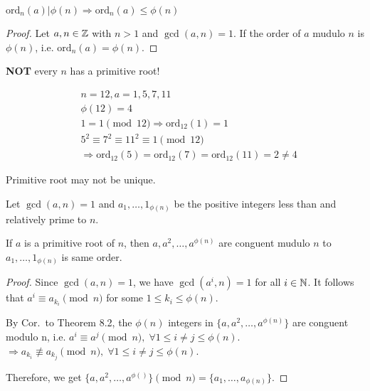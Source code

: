 
\begin{theorem}
    $\text{ord}_{n}(a) | \phi(n) \Rightarrow \text{ord}_{n}(a) \leq \phi(n)$ 
\end{theorem}
\begin{proof}
    Let $a, n \in \mathbb{Z}$ with $n > 1$ and $\gcd(a, n) = 1$. If the order of $a$ mudulo $n$ is $\phi(n)$, i.e.
    $\text{ord}_{n}(a) = \phi(n)$.
\end{proof}


\begin{remark}
    \textbf{NOT} every $n$ has a primitive root!
\end{remark}
\begin{eg}
    \[
        \begin{aligned}        
            & n=12, a=1, 5, 7, 11 \\
            & \phi(12) = 4 \\
            & 1 = 1 \pmod {12} \Rightarrow \text{ord}_{12}(1) = 1 \\
            & 5^2 \equiv 7^2 \equiv 11^2 \equiv 1 \pmod {12} \\
            & \Rightarrow \text{ord}_{12}(5) = \text{ord}_{12}(7) = \text{ord}_{12}(11) = 2 \neq 4
        \end{aligned}
    \]
\end{eg}
\begin{remark}
    Primitive root may not be unique.
\end{remark}


\begin{theorem}
    Let $\gcd(a, n) = 1$ and $a_1, \dots, 1_{\phi(n)}$ be the positive
    integers less than and relatively prime to $n$.

    If $a$ is a primitive root of $n$, then $a, a^2, \dots, a^{\phi(n)}$
    are conguent mudulo $n$ to $a_1, \dots, 1_{\phi(n)}$ is same order.
\end{theorem}
\begin{proof}
    Since $\gcd(a, n) = 1$, we have $\gcd(a^i, n) = 1$ for all $i \in \mathbb{N}$.
    It follows that $a^i \equiv a_{k_i} \pmod n$ for some $1 \leq k_i \leq \phi(n)$.

    By Cor.\ to Theorem 8.2, the $\phi(n)$ integers in $\{a, a^2, \dots, a^{\phi(n)}\}$
    are conguent modulo n, i.e. $a^i \equiv a^j \pmod n, \; \forall 1 \leq i \neq j \leq \phi(n)$.
    $\Rightarrow a_{k_i} \not \equiv a_{k_j} \pmod n,\; \forall 1 \leq i \neq j \leq \phi(n)$.

    Therefore, we get $\{a, a^2, \dots, a^{\phi()}\} \pmod n = \{a_1, \dots, a_{\phi(n)}\}$.
\end{proof}

